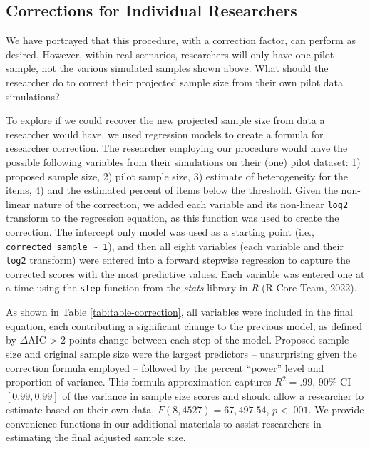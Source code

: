 \documentclass[
  man]{apa7}
\begin{document}
\hypertarget{corrections-for-individual-researchers}{%
\subsection{Corrections for Individual Researchers}\label{corrections-for-individual-researchers}}

We have portrayed that this procedure, with a correction factor, can perform as desired. However, within real scenarios, researchers will only have one pilot sample, not the various simulated samples shown above. What should the researcher do to correct their projected sample size from their own pilot data simulations?

To explore if we could recover the new projected sample size from data a researcher would have, we used regression models to create a formula for researcher correction. The researcher employing our procedure would have the possible following variables from their simulations on their (one) pilot dataset: 1) proposed sample size, 2) pilot sample size, 3) estimate of heterogeneity for the items, 4) and the estimated percent of items below the threshold. Given the non-linear nature of the correction, we added each variable and its non-linear \texttt{log2} transform to the regression equation, as this function was used to create the correction. The intercept only model was used as a starting point (i.e., \texttt{corrected\ sample\ \textasciitilde{}\ 1}), and then all eight variables (each variable and their \texttt{log2} transform) were entered into a forward stepwise regression to capture the corrected scores with the most predictive values. Each variable was entered one at a time using the \texttt{step} function from the \emph{stats} library in \emph{R} (R Core Team, 2022).

As shown in Table \ref{tab:table-correction}, all variables were included in the final equation, each contributing a significant change to the previous model, as defined by \(\Delta\)AIC \textgreater{} 2 points change between each step of the model. Proposed sample size and original sample size were the largest predictors -- unsurprising given the correction formula employed -- followed by the percent ``power'' level and proportion of variance. This formula approximation captures \(R^2 = .99\), 90\% CI \([0.99, 0.99]\) of the variance in sample size scores and should allow a researcher to estimate based on their own data, \(F(8, 4527) = 67,497.54\), \(p < .001\). We provide convenience functions in our additional materials to assist researchers in estimating the final adjusted sample size.
\end{document}
